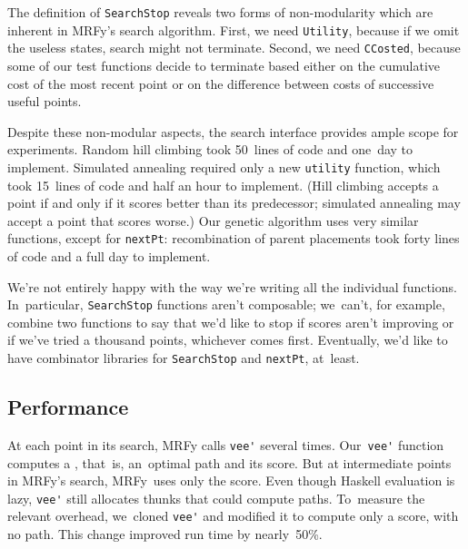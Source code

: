 \documentclass[preprint,nonatbib,blockstyle,times]{sigplanconf}
\newcommand\mrfy{MRFy} %
\newcommand\seclabel[1]{\label{sec:#1}}
\begin{document}
The definition of \texttt{SearchStop} reveals two forms of
non-modularity which are inherent in \mrfy's search algorithm.
First, we need \texttt{Utility}, because if we omit the useless states,
search might not terminate.
Second, we need \texttt{CCosted}, because some of our test functions
decide to terminate based either on the cumulative cost of the most
recent point or on the difference between costs of successive useful points.

Despite these non-modular aspects, the search
interface provides ample scope for
experiments.
Random hill climbing took 50~lines of code and one~day to
implement.  
Simulated annealing required only a new
\texttt{utility} function, which took 15~lines of code and half an hour to implement.
(Hill climbing accepts a point if and only if it scores better than its
predecessor;
simulated annealing may accept a point that scores worse.)
Our genetic algorithm uses very similar
functions, except for \texttt{nextPt}:
recombination of parent
placements took forty lines of code
and a full day to implement.
{\ifpagetuning{} \par\fi}

We're not entirely happy with the way we're writing all the individual
functions.
In~particular, \texttt{SearchStop} functions aren't composable;
we~can't, for example, combine two functions to say that we'd like to
stop if scores aren't improving or if we've tried a thousand points,
whichever comes first.
Eventually, we'd like to have
combinator libraries for \texttt{SearchStop} and \texttt{nextPt}, at~least.



\subsection{Performance}

\seclabel{perf}
\seclabel{performance}

At each point in its search,
MRFy calls \verb+vee'+ several
 times.
Our~\verb+vee'+
function computes a \mbox{}, that~is, 
an~optimal path and its score.
But at intermediate points in \mrfy's search,
\mrfy\ uses only the
score.
Even though Haskell evaluation is lazy, \verb+vee'+ 
still allocates thunks that could compute paths.
To~measure the relevant overhead,
we~cloned \verb+vee'+ and modified it to compute
only a score, with no path.
This change improved 
run time by nearly~50\%.
\end{document}
